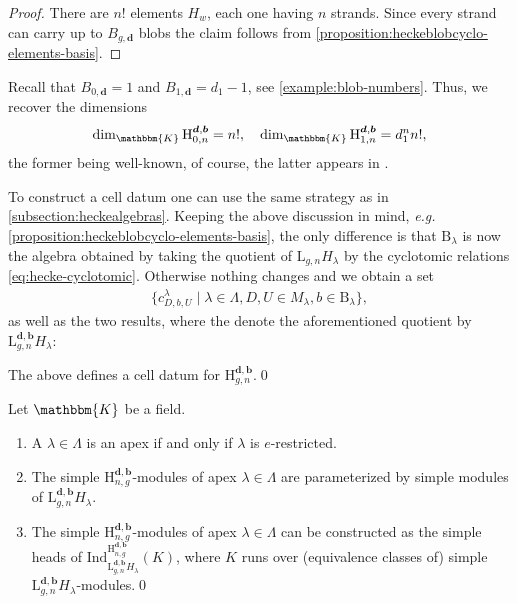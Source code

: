 \documentclass[a4paper,11pt]{amsart}
\newcommand{\eg}{\textsl{e.g.}}
\newcommand{\setstuff}[1]{\mathrm{#1}}
\newcommand{\KK}{\mathbbm{K}}
\newcommand{\bsym}[1]{\boldsymbol{#1}}
\newcommand{\bpar}{\bsym{b}}
\newcommand{\dpar}{\bsym{d}}
\numberwithin{equation}{section}
\let\fullref\autoref
\begin{document}
\begin{proof}
There are $n!$ elements $H_{w}$, each one having $n$ strands.
Since every strand can carry up 
to $B_{g,\dpar}$ blobs the 
claim follows from \fullref{proposition:heckeblobcyclo-elements-basis}. 
\end{proof}

\begin{remark}
Recall that $B_{0,\dpar}=1$ and $B_{1,\dpar}=d_{1}-1$, see 
\fullref{example:blob-numbers}. Thus, we recover the dimensions
\begin{gather*}
\dim_{\KK}\setstuff{H}_{0,n}^{\dpar,\bpar}=n!,
\quad
\dim_{\KK}\setstuff{H}_{1,n}^{\dpar,\bpar}=d_{1}^{n}n!,
\end{gather*}
the former being well-known, of course, the latter 
appears in \cite[(3.10)]{ArKo-hecke-algebra}.
\end{remark}

To construct a cell datum one can use the same strategy 
as in \fullref{subsection:heckealgebras}. 
Keeping the above discussion in mind, {\eg} 
\fullref{proposition:heckeblobcyclo-elements-basis}, the 
only difference is that $\setstuff{B}_{\lambda}$ 
is now the algebra obtained by taking the quotient of
$\setstuff{L}_{g,n}H_{\lambda}$ by 
the cyclotomic relations \eqref{eq:hecke-cyclotomic}. 
Otherwise nothing changes and we obtain a set 
\begin{gather*}
\{c_{D,b,U}^{\lambda}\mid\lambda\in\Lambda,D,U\in M_{\lambda},
b\in\setstuff{B}_{\lambda}\},
\end{gather*} 
as well as the two results, where the denote the 
aforementioned quotient by $\setstuff{L}_{g,n}^{\dpar,\bpar}H_{\lambda}$:

\begin{proposition}
The above defines a 
cell datum for $\setstuff{H}_{g,n}^{\dpar,\bpar}$.\qed
\end{proposition}

\begin{theorem}\label{theorem:checke}
Let $\KK$ be a field.
\begin{enumerate}

\item A $\lambda\in\Lambda$ is an apex 
if and only if $\lambda$ is $e$-restricted.

\item The simple $\setstuff{H}_{n,g}^{\dpar,\bpar}$-modules of 
apex $\lambda\in\Lambda$ 
are parameterized by simple modules of $\setstuff{L}_{g,n}^{\dpar,\bpar}H_{\lambda}$.

\item The simple $\setstuff{H}_{n,g}^{\dpar,\bpar}$-modules of 
apex $\lambda\in\Lambda$ can be constructed as 
the simple heads of
$\mathrm{Ind}_{\setstuff{L}_{g,n}^{\dpar,\bpar}
H_{\lambda}}^{\setstuff{H}_{n,g}^{\dpar,\bpar}}(K)$, 
where $K$ runs over (equivalence classes of) 
simple $\setstuff{L}_{g,n}^{\dpar,\bpar}H_{\lambda}$-modules.\qed

\end{enumerate}
\end{theorem}
\end{document}
